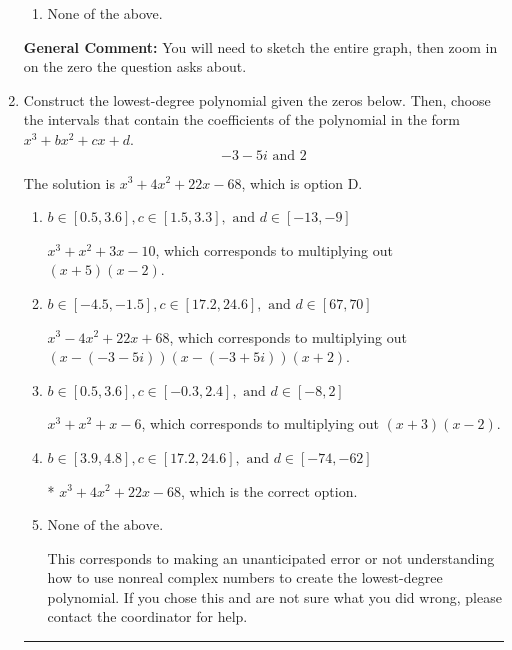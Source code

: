 \documentclass{extbook}[14pt]
\newcommand{\litem}[1]{\item #1

\rule{\textwidth}{0.4pt}}
\begin{document}
\begin{enumerate}
{\begin{enumerate}[label=\Alph*.]
\item None of the above.\end{enumerate}
\textbf{General Comment:} You will need to sketch the entire graph, then zoom in on the zero the question asks about.
}
\litem{
Construct the lowest-degree polynomial given the zeros below. Then, choose the intervals that contain the coefficients of the polynomial in the form $x^3+bx^2+cx+d$.
\[ -3 - 5 i \text{ and } 2 \]

The solution is \( x^{3} +4 x^{2} +22 x -68 \), which is option D.\begin{enumerate}[label=\Alph*.]
\item \( b \in [0.5, 3.6], c \in [1.5, 3.3], \text{ and } d \in [-13, -9] \)

$x^{3} + x^{2} +3 x -10$, which corresponds to multiplying out $(x + 5)(x -2)$.
\item \( b \in [-4.5, -1.5], c \in [17.2, 24.6], \text{ and } d \in [67, 70] \)

$x^{3} -4 x^{2} +22 x + 68$, which corresponds to multiplying out $(x-(-3 - 5 i))(x-(-3 + 5 i))(x + 2)$.
\item \( b \in [0.5, 3.6], c \in [-0.3, 2.4], \text{ and } d \in [-8, 2] \)

$x^{3} + x^{2} +x -6$, which corresponds to multiplying out $(x + 3)(x -2)$.
\item \( b \in [3.9, 4.8], c \in [17.2, 24.6], \text{ and } d \in [-74, -62] \)

* $x^{3} +4 x^{2} +22 x -68$, which is the correct option.
\item \( \text{None of the above.} \)

This corresponds to making an unanticipated error or not understanding how to use nonreal complex numbers to create the lowest-degree polynomial. If you chose this and are not sure what you did wrong, please contact the coordinator for help.
\end{enumerate}

}
\end{enumerate}
\end{document}
